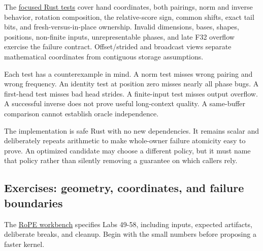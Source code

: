 \documentclass[
  10pt,
]{article}
\begin{document}
The
\href{https://github.com/hermonai/inside-the-llm-engine/blob/astra-visual-rewrite/code/mini-engine/crates/engine0/tests/rope.rs}{focused
Rust tests} cover hand coordinates, both pairings, norm and inverse
behavior, rotation composition, the relative-score sign, common shifts,
exact tail bits, and fresh-versus-in-place ownership. Invalid
dimensions, bases, shapes, positions, non-finite inputs, unrepresentable
phases, and late F32 overflow exercise the failure contract.
Offset/strided and broadcast views separate mathematical coordinates
from contiguous storage assumptions.

Each test has a counterexample in mind. A norm test misses wrong pairing
and wrong frequency. An identity test at position zero misses nearly all
phase bugs. A first-head test misses bad head strides. A finite-input
test misses output overflow. A successful inverse does not prove useful
long-context quality. A same-buffer comparison cannot establish oracle
independence.

The implementation is safe Rust with no new dependencies. It remains
scalar and deliberately repeats arithmetic to make whole-owner failure
atomicity easy to prove. An optimized candidate may choose a different
policy, but it must name that policy rather than silently removing a
guarantee on which callers rely.

\subsection{Exercises: geometry, coordinates, and failure
boundaries}\label{exercises-geometry-coordinates-and-failure-boundaries}

The
\href{https://github.com/hermonai/inside-the-llm-engine/blob/astra-visual-rewrite/labs/lab-49-rope-position-workbench.md}{RoPE
workbench} specifies Labs 49-58, including inputs, expected artifacts,
deliberate breaks, and cleanup. Begin with the small numbers before
proposing a faster kernel.
\end{document}
